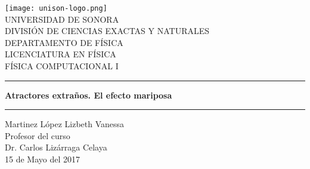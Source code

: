 \documentclass[12pt]{article}
\begin{document}
\begin{center}
\texttt{[image: unison-logo.png]}
\\
\vspace{0.5cm}
UNIVERSIDAD DE SONORA \\
\vspace{0.5cm}
DIVISIÓN DE CIENCIAS EXACTAS Y NATURALES \\
\vspace{0.5cm}
DEPARTAMENTO DE FÍSICA\\
\vspace{0.5cm}
LICENCIATURA EN FÍSICA\\
\vspace{0.5cm}
FÍSICA COMPUTACIONAL I

\vspace{2 cm}
\hrule
\vspace{1 cm}

{\huge \bfseries {Atractores extraños. El efecto mariposa}}

\vspace{1 cm}
\hrule
\vspace{2 cm}
Martinez López Lizbeth Vanessa \\ 
\vspace{1 cm}
Profesor del curso\\
Dr. Carlos Lizárraga Celaya\\
\vspace{2 cm}
15 de Mayo del 2017
\end{center}
\pagebreak
\end{document}
